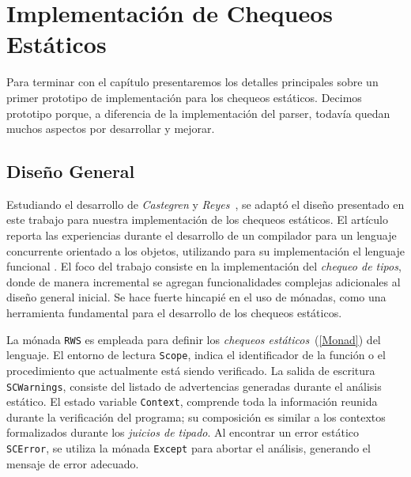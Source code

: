 \section{Implementación de Chequeos Estáticos}

Para terminar con el capítulo presentaremos los detalles principales sobre un primer prototipo de implementación para los chequeos estáticos.
Decimos prototipo porque, a diferencia de la implementación del parser, todavía quedan muchos aspectos por desarrollar y mejorar.


\subsection{Diseño General}

Estudiando el desarrollo de \textit{Castegren} y \textit{Reyes}~\cite{MonadicTC}, se adaptó el diseño presentado en este trabajo para nuestra implementación de los chequeos estáticos.
El artículo reporta las experiencias durante el desarrollo de un compilador para un lenguaje concurrente orientado a los objetos, utilizando para su implementación el lenguaje funcional \Haskell{}.
El foco del trabajo consiste en la implementación del \textit{chequeo de tipos}, donde de manera incremental se agregan funcionalidades complejas adicionales al diseño general inicial.
Se hace fuerte hincapié en el uso de mónadas, como una herramienta fundamental para el desarrollo de los chequeos estáticos.

La mónada \lstinline[style = haskell]{RWS} es empleada para definir los \textit{chequeos estáticos}~(\ref{Monad}) del lenguaje.
El entorno de lectura \lstinline[style = haskell]{Scope}, indica el identificador de la función o el procedimiento que actualmente está siendo verificado.
La salida de escritura \lstinline[style = haskell]{SCWarnings}, consiste del listado de advertencias generadas durante el análisis estático.
El estado variable \lstinline[style = haskell]{Context}, comprende toda la información reunida durante la verificación del programa; su composición es similar a los contextos formalizados durante los \textit{juicios de tipado}.
Al encontrar un error estático \lstinline[style = haskell]{SCError}, se utiliza la mónada \lstinline[style = haskell]{Except} para abortar el análisis, generando el mensaje de error adecuado.

